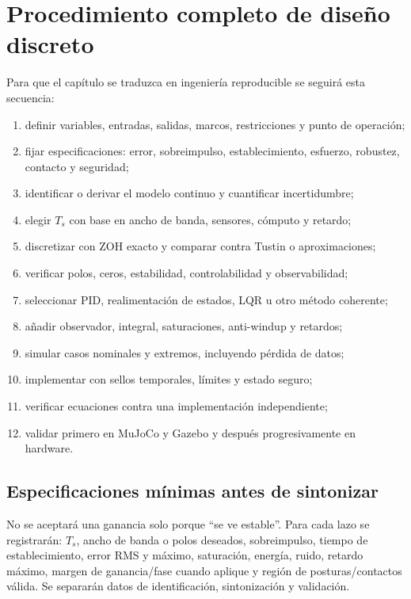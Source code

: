 \documentclass[11pt,letterpaper]{article}
\begin{document}
\section{Procedimiento completo de diseño discreto}
Para que el capítulo se traduzca en ingeniería reproducible se seguirá esta
secuencia:
\begin{enumerate}
 \item definir variables, entradas, salidas, marcos, restricciones y punto de
 operación;
 \item fijar especificaciones: error, sobreimpulso, establecimiento, esfuerzo,
 robustez, contacto y seguridad;
 \item identificar o derivar el modelo continuo y cuantificar incertidumbre;
 \item elegir $T_s$ con base en ancho de banda, sensores, cómputo y retardo;
 \item discretizar con ZOH exacto y comparar contra Tustin o aproximaciones;
 \item verificar polos, ceros, estabilidad, controlabilidad y observabilidad;
 \item seleccionar PID, realimentación de estados, LQR u otro método coherente;
 \item añadir observador, integral, saturaciones, anti-windup y retardos;
 \item simular casos nominales y extremos, incluyendo pérdida de datos;
 \item implementar con sellos temporales, límites y estado seguro;
 \item verificar ecuaciones contra una implementación independiente;
 \item validar primero en MuJoCo y Gazebo y después progresivamente en hardware.
\end{enumerate}

\subsection{Especificaciones mínimas antes de sintonizar}
No se aceptará una ganancia solo porque ``se ve estable''. Para cada lazo se
registrarán: $T_s$, ancho de banda o polos deseados, sobreimpulso, tiempo de
establecimiento, error RMS y máximo, saturación, energía, ruido, retardo máximo,
margen de ganancia/fase cuando aplique y región de posturas/contactos válida.
Se separarán datos de identificación, sintonización y validación.
\end{document}
